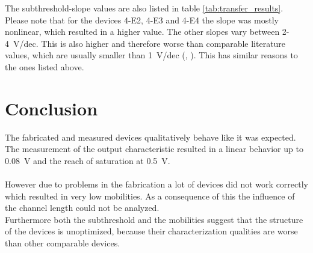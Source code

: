 \documentclass[%
 reprint,
amsmath,amssymb,
pra,
]{revtex4-1}
\begin{document}
The subthreshold-slope values are also listed in table \ref{tab:transfer_results}. Please note that for the devices 4-E2, 4-E3 and 4-E4 the slope was mostly nonlinear, which resulted in a higher value. The other slopes vary between 2-\SI{4}{V/dec}. This is also higher and therefore worse than comparable literature values, which are usually smaller than \SI{1}{V/dec} (\cite{Loss98}, \cite{mos}). This has similar reasons to the ones listed above.
\section{Conclusion}
The fabricated and measured devices qualitatively behave like it was expected. The measurement of the output characteristic resulted in a linear behavior up to \SI{0.08}{V} and the reach of saturation at \SI{0.5}{V}.\\
\\
However due to problems in the fabrication a lot of devices did not work correctly which resulted in very low mobilities. As a consequence of this the influence of the channel length could not be analyzed.\\
Furthermore both the subthreshold and the mobilities suggest that the structure of the devices is unoptimized, because their characterization qualities are worse than other comparable devices.


\end{document}

